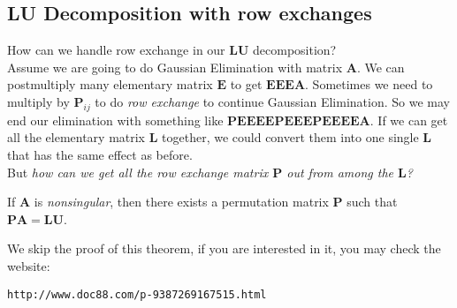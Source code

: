 \subsection{LU Decomposition with row exchanges}
How can we handle row exchange in our $\bm{LU}$ decomposition? \\
Assume we are going to do
Gaussian Elimination with matrix $\bm A$. We can postmultiply many elementary matrix $\bm E$ to get
$\bm{EEEA}$. Sometimes we need to multiply by $\bm P_{ij}$ to do \textit{row exchange} to continue Gaussian
Elimination. So we may end our elimination with something like $\bm{PEEEEPEEEPEEEEA}$. If
we can get all the elementary matrix $\bm L$ together, we could convert them into one single $\bm L$ that has
the same effect as before. \\But \textit{how can we get all the row exchange matrix $\bm P$ out from among
the $\bm L$?}\\
\begin{theorem}
If $\bm A$ is \textit{nonsingular}, then there exists a permutation matrix $\bm P$ such that $\bm{PA}=\bm{LU}$.
\end{theorem}
We skip the proof of this theorem, if you are interested in it, you may check the website:
\begin{verbatim}
http://www.doc88.com/p-9387269167515.html
\end{verbatim}
